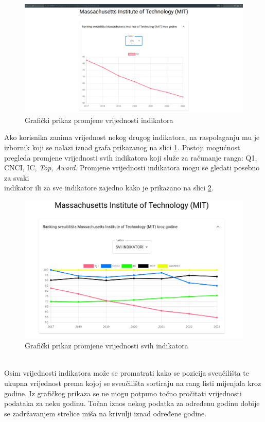 \documentclass[times, utf8, zavrsni]{fer}
\begin{document}
\begin{figure}[htb]
    \centering
       \includegraphics[scale=0.17]{uni1.png} 
       \caption{Grafički prikaz promjene vrijednosti indikatora}
       \label{fig:unipage1}
       \end{figure}
       
Ako korisnika zanima vrijednost nekog drugog indikatora, na raspolaganju mu je izbornik 
koji se nalazi iznad grafa prikazanog na slici \ref{fig:unipage1}. Postoji mogućnost pregleda promjene vrijednosti svih indikatora koji služe za računanje ranga: Q1, CNCI, IC, \emph{Top}, \emph{Award}. 
Promjene vrijednosti indikatora mogu se gledati posebno za svaki \\indikator ili za sve indikatore zajedno kako je prikazano na slici \ref{fig:svi}.
\begin{figure}[htb]
    \centering
       \includegraphics[scale=0.3]{svi.png} 
       \caption{Grafički prikaz promjene vrijednosti svih indikatora}
       \label{fig:svi}
       \end{figure}
\\Osim vrijednosti indikatora može se promatrati kako se pozicija  sveučilišta te ukupna vrijednost  prema kojoj se sveučilišta 
sortiraju na rang listi mijenjala kroz godine. Iz grafičkog prikaza se ne mogu potpuno točno pročitati vrijednosti podataka za neku godinu. Točan iznos 
nekog podatka za određenu godinu dobije se zadržavanjem strelice miša na krivulji iznad određene godine.
\end{document}
